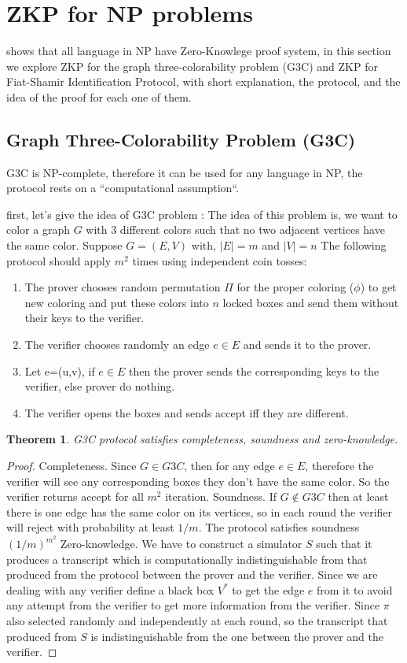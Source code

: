 \documentclass[10pt,a4paper]{article}
\newtheorem{thm}{Theorem}
\newtheorem{proof}{Proof}
\begin{document}
\section{ZKP for NP problems}
\cite{goldreich2019proofs:21} shows that all language in NP have Zero-Knowlege proof system, in this section we explore  ZKP for the graph three-colorability problem (G3C) and ZKP for Fiat-Shamir Identification Protocol, with short explanation, the protocol, and the idea of the proof for each one of them. 
\subsection{Graph Three-Colorability Problem (G3C)
\cite{morais2019survey:19}}
G3C is NP-complete, therefore it can be used for any language in NP, the protocol rests on a ``computational assumption``.

first, let's give the idea of G3C problem :
The idea of this problem is, we want to color a graph $G$ with 3 different colors such that no two adjacent vertices have the same color.  Suppose $G=(E,V)$ with, $\mid E\mid=m$ and $\mid V\mid=n$
The following protocol should apply $m^2$ times using independent coin tosses:
\begin{enumerate}
	\item The prover chooses random permutation $\Pi$ for the proper coloring ($\phi$) to get new coloring and put these colors into $n$ locked boxes and send them without their keys to the verifier.
	\item The verifier chooses randomly an edge $e\in E$ and sends it to the prover.
	\item Let e=(u,v), if $e\in E$ then the prover sends the corresponding keys to the verifier, else prover do nothing.
	\item The verifier opens the boxes and sends accept iff they are different.
\end{enumerate}

\begin{thm}
	G3C protocol satisfies completeness, soundness and zero-knowledge.
\end{thm}
\begin{proof}
	Completeness. Since $G \in G3C$, then for any edge $e \in E$, therefore the verifier will see any corresponding boxes they don’t have the same color.
	So the verifier returns accept for all $m^2$ iteration.
	Soundness. If $G\notin G3C$ then at least there is one edge has the same color on its vertices, so in each round the verifier will reject with probability at least $1/m$.
	The protocol satisfies soundness $(1/m)^{m^2}$
	Zero-knowledge. We have to construct a simulator $S$ such that it produces a transcript which is computationally indistinguishable from that produced from the protocol between the prover and the verifier.
	Since we are dealing with any verifier  define a black box $V^*$ to get the edge $e$ from it to avoid any attempt from the verifier to get more information from the verifier.
	Since $\pi$ also selected randomly and independently at each round, so the transcript that produced from $S$ is indistinguishable from the one between the prover and the verifier.
\end{proof}
 

 
\end{document}

